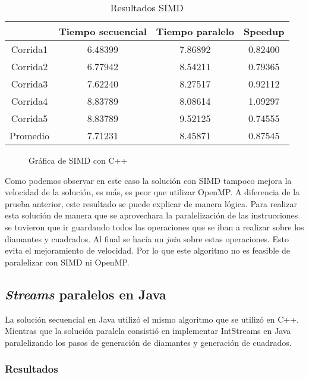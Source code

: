 \documentclass[10pt,letterpaper,oneside]{article}
\begin{document}
\begin{table}[H]
	\centering
	\begin{tabular}{|c|c|c|c|}
		\hline
			& Tiempo secuencial & Tiempo paralelo & Speedup \\
		\hline
			Corrida1 & 6.48399 & 7.86892 & 0.82400 \\
			Corrida2 & 6.77942 & 8.54211 & 0.79365 \\
			Corrida3 & 7.62240 & 8.27517 & 0.92112 \\
			Corrida4 & 8.83789 & 8.08614 & 1.09297 \\
			Corrida5 & 8.83789 & 9.52125 & 0.74555 \\
		\hline
			Promedio & 7.71231 & 8.45871 & 0.87545 \\
		\hline
	\end{tabular}
	\caption{Resultados SIMD}
	\label{tab:simd}
\end{table}

\begin{figure}[H]
	\centering
	\caption{Gráfica de SIMD con C++}
	\label{fig:plot_simd}	
\end{figure}

Como podemos observar en este caso la solución con SIMD tampoco mejora la velocidad de la solución, es más, es peor que utilizar OpenMP. A diferencia de la prueba anterior, este resultado se puede explicar de manera lógica. Para realizar esta solución de manera que se aprovechara la paralelización de las instrucciones se tuvieron que ir guardando todos las operaciones que se iban a realizar sobre los diamantes y cuadrados. Al final se hacía un \textit{join} sobre estas operaciones. Esto evita el mejoramiento de velocidad. Por lo que este algoritmo no es feasible de paralelizar con SIMD ni OpenMP.

\subsection{\textit{Streams} paralelos en Java}

La solución secuencial en Java utilizó el mismo algoritmo que se utilizó en C++. Mientras que la solución paralela consistió en implementar IntStreams en Java paralelizando los pasos de generación de diamantes y generación de cuadrados. 

\subsubsection{Resultados}
\end{document}
